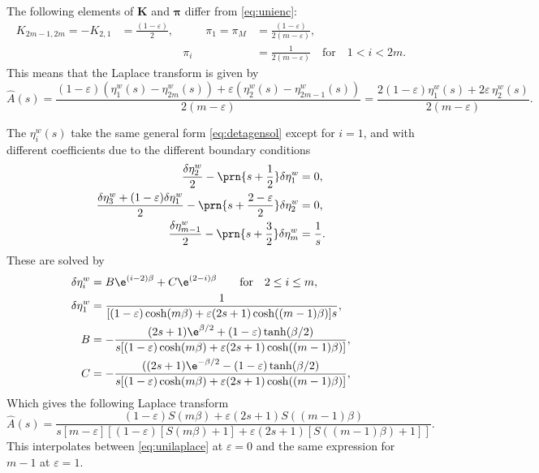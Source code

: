 \documentclass[12pt]{article}
\newcommand{\eqm}{\pi}
\newcommand{\eq}{\boldsymbol{\eqm}}
\newcommand{\etwm}{\eta^w}
\newcommand{\encm}{K}
\newcommand{\enc}{\mathbf{\encm}}
\begin{document}
The following elements of \(\enc\) and \(\eq\) differ from \eqref{eq:unienc}:
%
\begin{equation}\label{eq:shortenenc}
  \begin{aligned}
  \encm_{2m-1,2m} = -\encm_{2,1} &= \frac{(1-\varepsilon)}{2},
  &\qquad
  \eqm_1 = \eqm_M &= \frac{(1-\varepsilon)}{2(m-\varepsilon)},
  \\ &&
  \eqm_i &=  \frac{1}{2(m-\varepsilon)}
  \quad\text{for}\quad 1<i<2m.
  \end{aligned}
\end{equation}
%
This means that the Laplace transform is given by
%
\begin{equation}\label{eq:shortenareaeta}
  \hat{A}(s) = \frac{(1-\varepsilon)(\etwm_1(s)-\etwm_{2m}(s)) 
                      + \varepsilon(\etwm_2(s)-\etwm_{2m-1}(s))}
                    {2(m-\varepsilon)}
       = \frac{2(1-\varepsilon) \etwm_1(s) + 2\varepsilon\,\etwm_2(s)}
              {2(m-\varepsilon)}.
\end{equation}
%

The \(\etwm_i(s)\) take the same general form \eqref{eq:detagensol} except for \(i=1\), and with different coefficients due to the different boundary conditions
%
\begin{equation}\label{eq:detabndshorten}
\begin{aligned}
  \frac{\delta\etwm_2}{2} - \prn{s+\frac{1}{2}}\delta\etwm_1 &= 0, \\
  \frac{\delta\etwm_3 + (1-\varepsilon)\delta\etwm_1}{2} - \prn{s+\frac{2-\varepsilon}{2}}\delta\etwm_2 &= 0, \\
  \frac{\delta\etwm_{m-1}}{2} - \prn{s+\frac{3}{2}}\delta\etwm_{m} &= \frac{1}{s}.
\end{aligned}
\end{equation}
%
These are solved by
%
%
\begin{equation}\label{eq:shortensol}
\begin{aligned}
  \delta\etwm_i &= B\e^{(i-2)\beta} + C\e^{(2-i)\beta} \qquad
        \text{for} \quad 2 \leq i \leq m, \\
  \delta\etwm_1 &= \frac{1}
         {[(1-\varepsilon)\cosh(m\beta) + \varepsilon(2s+1)\cosh((m-1)\beta)]s}, \\
  B &= - \frac{(2s+1) \e^{\beta/2} + (1-\varepsilon) \tanh(\beta/2)}
         {s [(1-\varepsilon)\cosh(m\beta) + \varepsilon(2s+1)\cosh((m-1)\beta)]}, \\
  C &= - \frac{((2s+1) \e^{-\beta/2} - (1-\varepsilon) \tanh(\beta/2)}
         {s [(1-\varepsilon)\cosh(m\beta) + \varepsilon(2s+1)\cosh((m-1)\beta)]}, \\
\end{aligned}
\end{equation}
%
Which gives the following Laplace transform
%
\begin{equation}\label{eq:shortenlaplace}
  \hat{A}(s) = \frac{(1-\varepsilon) S(m\beta) + \varepsilon(2s+1) S((m-1)\beta)}
          { s [m-\varepsilon]
            [(1-\varepsilon)[S(m\beta) + 1] + \varepsilon(2s+1)[S((m-1)\beta) + 1]] }.
\end{equation}
%
This interpolates between \eqref{eq:unilaplace} at \(\varepsilon=0\) and the same expression for \(m-1\) at \(\varepsilon=1\).
\end{document}
